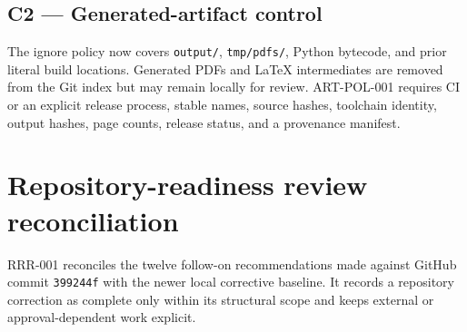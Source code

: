 \documentclass[11pt,letterpaper]{article}
\begin{document}
\subsection{C2 --- Generated-artifact control}

The ignore policy now covers \nolinkurl{output/}, \nolinkurl{tmp/pdfs/}, Python bytecode, and prior literal build locations. Generated PDFs and LaTeX intermediates are removed from the Git index but may remain locally for review. ART-POL-001 requires CI or an explicit release process, stable names, source hashes, toolchain identity, output hashes, page counts, release status, and a provenance manifest.

\section{Repository-readiness review reconciliation}

RRR-001 reconciles the twelve follow-on recommendations made against GitHub commit \texttt{399244f} with the newer local corrective baseline. It records a repository correction as complete only within its structural scope and keeps external or approval-dependent work explicit.
\end{document}
